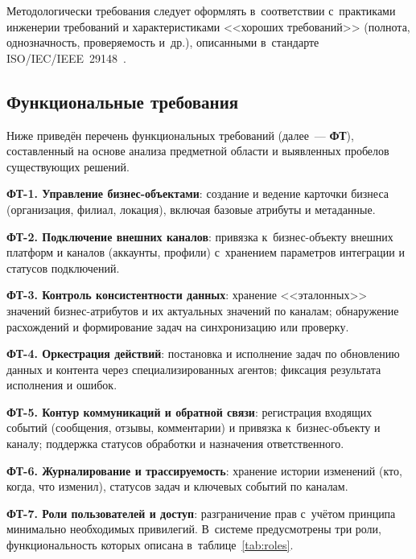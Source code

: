 Методологически требования следует оформлять в~соответствии с~практиками инженерии требований и характеристиками <<хороших требований>> (полнота, однозначность, проверяемость и~др.), описанными в~стандарте ISO/IEC/IEEE~29148~\cite{src:8}.

\subsection{Функциональные требования}
\label{subsec:functional-req}

Ниже приведён перечень функциональных требований (далее~--- \textbf{ФТ}), составленный на основе анализа предметной области и выявленных пробелов существующих решений.

\textbf{ФТ-1. Управление бизнес-объектами}: создание и ведение карточки бизнеса (организация, филиал, локация), включая базовые атрибуты и метаданные.

\textbf{ФТ-2. Подключение внешних каналов}: привязка к~бизнес-объекту внешних платформ и каналов (аккаунты, профили) с~хранением параметров интеграции и статусов подключений.

\textbf{ФТ-3. Контроль консистентности данных}: хранение <<эталонных>> значений бизнес-атрибутов и их актуальных значений по каналам; обнаружение расхождений и формирование задач на синхронизацию или проверку.

\textbf{ФТ-4. Оркестрация действий}: постановка и исполнение задач по обновлению данных и контента через специализированных агентов; фиксация результата исполнения и ошибок.

\textbf{ФТ-5. Контур коммуникаций и обратной связи}: регистрация входящих событий (сообщения, отзывы, комментарии) и привязка к~бизнес-объекту и каналу; поддержка статусов обработки и назначения ответственного.

\textbf{ФТ-6. Журналирование и трассируемость}: хранение истории изменений (кто, когда, что изменил), статусов задач и ключевых событий по каналам.

\textbf{ФТ-7. Роли пользователей и доступ}: разграничение прав с~учётом принципа минимально необходимых привилегий. В~системе предусмотрены три роли, функциональность которых описана в~таблице~\ref{tab:roles}.

